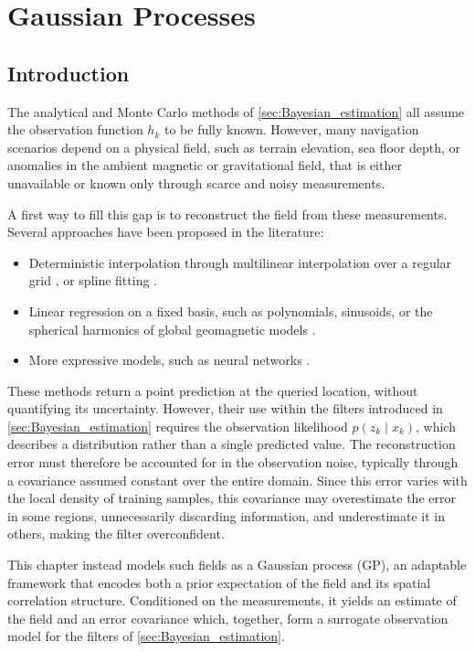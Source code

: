 \chapter{Gaussian Processes}\label{sec:Gaussian_processes}

\vfill
\localtableofcontents
\vfill
\newpage

\section{Introduction}

The analytical and Monte Carlo methods of \cref{sec:Bayesian_estimation} all assume the observation function $h_k$ to be fully known. However, many navigation scenarios depend on a physical field, such as terrain elevation, sea floor depth, or anomalies in the ambient magnetic or gravitational field, that is either unavailable or known only through scarce and noisy measurements.

A first way to fill this gap is to reconstruct the field from these measurements. Several approaches have been proposed in the literature:
\begin{itemize}
	\item Deterministic interpolation through multilinear interpolation over a regular grid \cite{bib:MPF-TAN,bib:bathymetry-gravimetry}, or spline fitting \cite{bib:splines}.
	\item Linear regression on a fixed basis, such as polynomials, sinusoids, or the spherical harmonics of global geomagnetic models \cite{bib:IGRF}.
	\item More expressive models, such as neural networks \cite{bib:neural-networks}.
\end{itemize}
These methods return a point prediction at the queried location, without quantifying its uncertainty. However, their use within the filters introduced in \cref{sec:Bayesian_estimation} requires the observation likelihood $p(z_k\mid x_k)$, which describes a distribution rather than a single predicted value. The reconstruction error must therefore be accounted for in the observation noise, typically through a covariance assumed constant over the entire domain.  Since this error varies with the local density of training samples, this covariance may overestimate the error in some regions, unnecessarily discarding information, and underestimate it in others, making the filter overconfident.

This chapter instead models such fields as a Gaussian process (GP), an adaptable framework that encodes both a prior expectation of the field and its spatial correlation structure. Conditioned on the measurements, it yields an estimate of the field and an error covariance which, together, form a surrogate observation model \cite{bib:GP-BayesFilters,bib:magnetic-GP-PF} for the filters of \cref{sec:Bayesian_estimation}.

